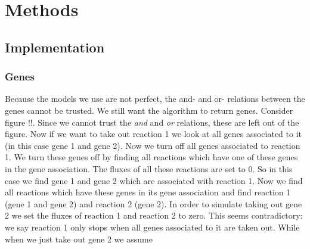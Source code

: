 \documentclass[10pt]{report}
\begin{document}
\section{Methods}
\subsection{Implementation}
\subsubsection{Genes}
Because the models we use are not perfect, the and- and or- relations between the genes cannot be trusted.
We still want the algorithm to return genes. Consider figure !!. Since we cannot trust the \emph{and} and \emph{or} relations, these are left out of the figure. Now if we want to take out reaction 1 we look at all genes associated to it (in this case gene 1 and gene 2). Now we turn off all genes associated to reaction 1. We turn these genes off by finding all reactions which have one of these genes in the gene association. The fluxes of all these reactions are set to 0. So in this case we find gene 1 and gene 2 which are associated with reaction 1. Now we find all reactions which have these genes in its gene association and find reaction 1 (gene 1 and gene 2) and reaction 2 (gene 2). In order to simulate taking out gene 2 we set the fluxes of reaction 1 and reaction 2 to zero. This seems contradictory: we say reaction 1 only stops when all genes associated to it are taken out. While when we just take out gene 2 we assume  
\end{document}
